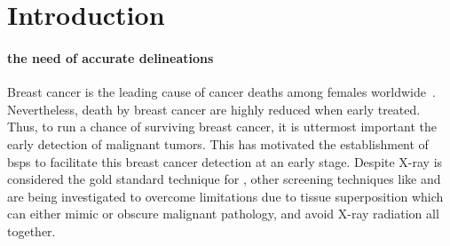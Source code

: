 \graphicspath{ {./content/intro/figures/} }

\section*{Introduction}
\label{sec:intro}  %

\paragraph{the need of accurate delineations}
\label{sec:intro:to_delinations}  %
Breast cancer is the leading cause of cancer deaths among females worldwide~\cite{cancerStatistics2011}.
Nevertheless, death by breast cancer are highly reduced when early treated.
Thus, to run a chance of surviving breast cancer, it is uttermost important the early detection of malignant tumors.
This has motivated the establishment of \acp{bsp} to facilitate this breast cancer detection at an early stage.
Despite X-ray \dm is considered the gold standard technique for \bsp, other screening techniques like \us and \mri are being investigated
to overcome \dm limitations due to tissue superposition which can either mimic or obscure malignant pathology,
and avoid X-ray radiation all together.


